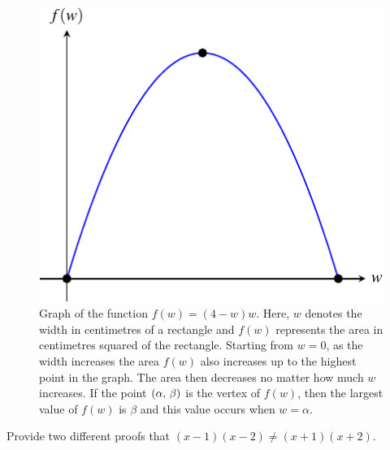 \documentclass[a4paper,oneside,12pt]{article}
\begin{document}
\begin{problem}
{\begin{solution}
\begin{figure}[!htbp]
\centering
\includegraphics[scale=1]{image/07/rectangle-largest-area.pdf}
\caption{%
  Graph of the function $f(w) = (4 - w)w$.  Here, $w$ denotes the
  width in centimetres of a rectangle and $f(w)$ represents the area
  in centimetres squared of the rectangle.  Starting from $w = 0$, as
  the width increases the area $f(w)$ also increases up to the highest
  point in the graph.  The area then decreases no matter how much $w$
  increases.  If the point $\left\lparen{\alpha},\, {\beta}\right\rparen$ is the vertex of
  $f(w)$, then the largest value of $f(w)$ is $\beta$ and this value
  occurs when $w = \alpha$.
}
\label{fig:rectangle_largest_area}
\end{figure}
\end{solution}
}{}

\item Provide two different proofs that
  $(x - 1)(x - 2) \neq (x + 1)(x + 2)$.
\end{problem}
\end{document}
